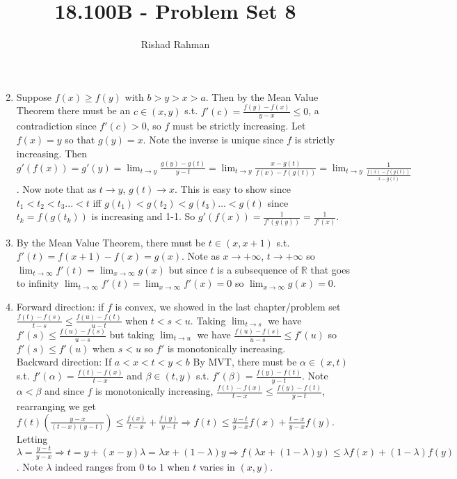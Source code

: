 \documentclass{article}
\begin{document}
\setlength{\abovedisplayskip}{0pt}
\setlength{\belowdisplayskip}{0pt}
\setlength{\abovedisplayshortskip}{0pt}
\setlength{\belowdisplayshortskip}{0pt}
\title{18.100B - Problem Set 8}
\author{Rishad Rahman}
\date{}
\maketitle
\begin{enumerate}
\setcounter{enumi}{1}
\item Suppose $f(x) \geq f(y)$ with $b>y > x>a$. Then by the Mean Value Theorem there must be an $c\in (x, y)$ s.t. $f'(c) = \frac{f(y) - f(x)}{y-x} \leq 0$, a contradiction since $f'(c) > 0 $, so $f$ must be strictly increasing. Let $f(x) = y$ so that $g(y) = x$. Note the inverse is unique since $f$ is strictly increasing. Then $g'(f(x))=g'(y)=\displaystyle\lim_{t\rightarrow y} \frac{g(y)-g(t)}{y-t}=\lim_{t\rightarrow y}\frac{x-g(t)}{f(x)-f(g(t))}=\lim_{t\rightarrow y}\frac{1}{\frac{f(x)-f(g(t))}{x-g(t)}}$. Now note that as $t\rightarrow y$, $g(t)\rightarrow x$. This is easy to show since $t_1 < t_2 < t_3... < t$ iff $g(t_1) < g(t_2) < g(t_3) ... < g(t)$ since $t_k=f(g(t_k))$ is increasing and 1-1. So $g'(f(x))=\displaystyle\frac{1}{f'(g(y))}=\frac{1}{f'(x)}$. \\
\setcounter{enumi}{4}
\item By the Mean Value Theorem, there must be $t\in (x, x+1)$ s.t. $f'(t)=f(x+1)-f(x)=g(x)$. Note as $x\rightarrow +\infty$, $t\rightarrow +\infty $ so $\displaystyle\lim_{t\rightarrow \infty} f'(t) = \displaystyle\lim_{x\rightarrow \infty} g(x)$ but since $t$ is a subsequence of $\mathbb{R}$ that goes to infinity $\displaystyle\lim_{t\rightarrow \infty} f'(t)=\displaystyle\lim_{x\rightarrow \infty} f'(x) =  0$ so $\displaystyle\lim_{x\rightarrow \infty} g(x)=0$. \\
\setcounter{enumi}{13}
\item Forward direction: if $f$ is convex, we showed in the last chapter/problem set $\displaystyle\frac{f(t)-f(s)}{t-s} \leq \frac{f(u)-f(t)}{u-t}$ when $t<s<u$. Taking $\lim_{t\rightarrow s}$ we have $f'(s) \leq \displaystyle\frac{f(u)-f(s)}{u-s}$ but taking $\lim_{t\rightarrow u}$ we have $\displaystyle\frac{f(u)-f(s)}{u-s}\leq f'(u)$ so $f'(s) \leq  f'(u)$ when $s < u$ so $f'$ is monotonically increasing. \\
Backward direction: If $a<x<t<y<b$ By MVT, there must be $\alpha\in(x,t)$ s.t. $f'(\alpha) = \displaystyle\frac{f(t)-f(x)}{t-x}$  and $\beta\in (t, y)$ s.t. $f'(\beta) = \displaystyle\frac{f(y)-f(t)}{y-t}$. Note $\alpha<\beta$ and since $f$ is monotonically increasing, $\displaystyle\frac{f(t)-f(x)}{t-x} \leq \displaystyle\frac{f(y)-f(t)}{y-t}$, rearranging we get $f(t)\displaystyle\left(\frac{y-x}{(t-x)(y-t)}\right)\leq  \frac{f(x)}{t-x}+ \frac{f(y)}{y-t}\Rightarrow f(t)  \leq \frac{y-t}{y-x} f(x)+\frac{t-x}{y-x} f(y)$. Letting $\lambda = \displaystyle \frac{y-t}{y-x} \Rightarrow t=y+(x-y)\lambda=\lambda x + (1-\lambda)y \Rightarrow f(\lambda x + (1-\lambda)y)\leq \lambda f(x) + (1-\lambda)f(y)$. Note $\lambda$ indeed ranges from $0$ to $1$ when $t$ varies in $(x, y)$. \\

\end{enumerate}
\end{document}
